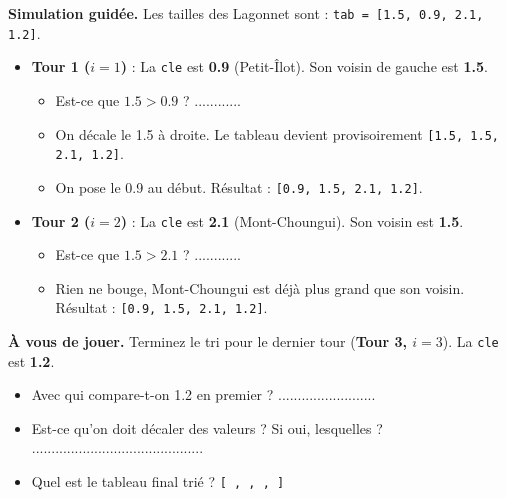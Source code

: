\begin{Exercise}[title={Analyse et Simulation}]

\Question \textbf{Simulation guidée.} 
Les tailles des Lagonnet sont : \texttt{tab = [1.5, 0.9, 2.1, 1.2]}.
\begin{itemize}
    \item \textbf{Tour 1 ($i=1$)} : La \texttt{cle} est \textbf{0.9} (Petit-Îlot). Son voisin de gauche est \textbf{1.5}.
    \begin{itemize}
        \item Est-ce que $1.5 > 0.9$ ? ............
        \item On décale le 1.5 à droite. Le tableau devient provisoirement \texttt{[1.5, 1.5, 2.1, 1.2]}.
        \item On pose le 0.9 au début. Résultat : \texttt{[0.9, 1.5, 2.1, 1.2]}.
    \end{itemize}
    \item \textbf{Tour 2 ($i=2$)} : La \texttt{cle} est \textbf{2.1} (Mont-Choungui). Son voisin est \textbf{1.5}.
    \begin{itemize}
        \item Est-ce que $1.5 > 2.1$ ? ............
        \item Rien ne bouge, Mont-Choungui est déjà plus grand que son voisin. Résultat : \texttt{[0.9, 1.5, 2.1, 1.2]}.
    \end{itemize}
\end{itemize}

\Question \textbf{À vous de jouer.} 
Terminez le tri pour le dernier tour (\textbf{Tour 3, $i=3$}). La \texttt{cle} est \textbf{1.2}.
\begin{itemize}
    \item Avec qui compare-t-on 1.2 en premier ? .........................
    \item Est-ce qu'on doit décaler des valeurs ? Si oui, lesquelles ? ............................................
    \item Quel est le tableau final trié ? \texttt{[ \quad , \quad , \quad , \quad ]}
\end{itemize}


\end{Exercise}
